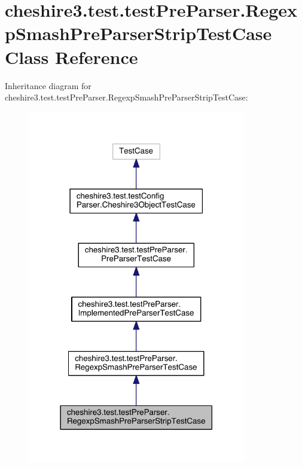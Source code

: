 \hypertarget{classcheshire3_1_1test_1_1test_pre_parser_1_1_regexp_smash_pre_parser_strip_test_case}{\section{cheshire3.\-test.\-test\-Pre\-Parser.\-Regexp\-Smash\-Pre\-Parser\-Strip\-Test\-Case Class Reference}
\label{classcheshire3_1_1test_1_1test_pre_parser_1_1_regexp_smash_pre_parser_strip_test_case}
}


Inheritance diagram for cheshire3.\-test.\-test\-Pre\-Parser.\-Regexp\-Smash\-Pre\-Parser\-Strip\-Test\-Case\-:
\nopagebreak
\begin{figure}[H]
\begin{center}
\leavevmode
\includegraphics[width=270pt]{classcheshire3_1_1test_1_1test_pre_parser_1_1_regexp_smash_pre_parser_strip_test_case__inherit__graph}
\end{center}
\end{figure}


